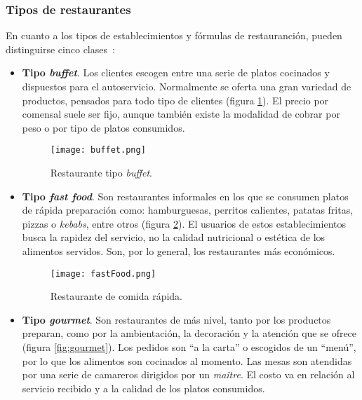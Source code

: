     \subsubsection{Tipos de restaurantes}
  En cuanto a los tipos de establecimientos y fórmulas de restauranción, pueden
  distinguirse cinco clases~\cite{bib:wiki}:
  \begin{itemize}
  \item \textbf{Tipo \emph{buffet}}. Los clientes escogen entre una serie de
  platos cocinados y dispuestos para el autoservicio. Normalmente se oferta
  una gran variedad de productos, pensados para todo tipo de clientes (figura
  \ref{fig:buffet}). El precio por comensal suele ser fijo, aunque también
  existe la modalidad de cobrar por peso o por tipo de platos consumidos.

  \begin{figure}[!h]
    \begin{center}
      \texttt{[image: buffet.png]}
      \caption{Restaurante tipo \emph{buffet}.}
      \label{fig:buffet}
    \end{center}
  \end{figure}

  \item \textbf{Tipo \emph{fast food}}. Son restaurantes informales en los que
  se consumen platos de rápida preparación como: hamburguesas, perritos
  calientes, patatas fritas, pizzas o \emph{kebabs}, entre otros (figura
  \ref{fig:fastFood}). El usuarios de estos establecimientos busca la rapidez 
  del servicio, no la calidad nutricional o estética de los alimentos 
  servidos. Son, por lo general, los restaurantes más económicos.

  \begin{figure}[!h]
    \begin{center}
      \texttt{[image: fastFood.png]}
      \caption{Restaurante de comida rápida.}
      \label{fig:fastFood}
    \end{center}
  \end{figure}

  \item \textbf{Tipo \emph{gourmet}}. Son restaurantes de más nivel, tanto por
  los productos preparan, como por la ambientación, la decoración y la atención
  que se ofrece (figura \ref{fig:gourmet}). Los pedidos son ``a la carta'' o
  escogidos de un ``menú'', por lo que los alimentos son cocinados al momento.
  Las mesas son atendidas por una serie de camareros dirigidos por un
  \emph{maître}. El costo va en relación al servicio recibido y a la calidad de
  los platos consumidos.


\end{itemize}
